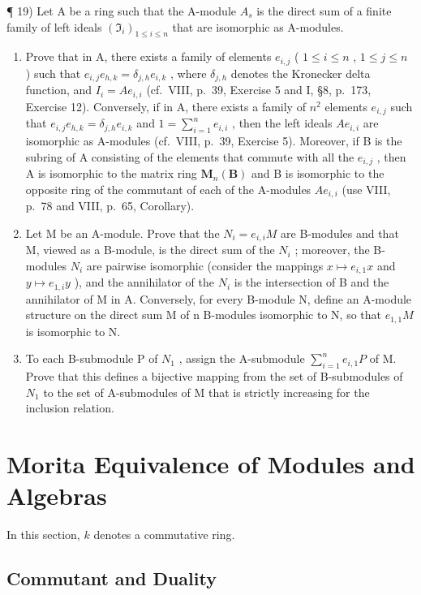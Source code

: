 ¶ 19) Let A be a ring such that the A-module \(A_{s}\) is the direct sum of a finite family of left ideals \((\mathfrak{I}_{i})_{1\leqslant i\leqslant n}\) that are isomorphic as A-modules.

\begin{enumerate}
\def\labelenumi{\alph{enumi})}
\item
  Prove that in A, there exists a family of elements \(e_{i,j}\) ( \(1 \leqslant i \leqslant n\) , \(1 \leqslant j \leqslant n\) ) such that \(e_{i,j}e_{h,k} = \delta_{j,h}e_{i,k}\) , where \(\delta_{j,h}\) denotes the Kronecker delta function, and \(I_i = Ae_{i,i}\) (cf.~VIII, p.~39, Exercise 5 and I, §8, p.~173, Exercise 12). Conversely, if in A, there exists a family of \(n^2\) elements \(e_{i,j}\) such that \(e_{i,j}e_{h,k} = \delta_{j,h}e_{i,k}\) and \(1 = \sum_{i=1}^{n} e_{i,i}\) , then the left ideals \(Ae_{i,i}\) are isomorphic as A-modules (cf.~VIII, p.~39, Exercise 5). Moreover, if B is the subring of A consisting of the elements that commute with all the \(e_{i,j}\) , then A is isomorphic to the matrix ring \(\mathbf{M}_n(\mathbf{B})\) and B is isomorphic to the opposite ring of the commutant of each of the A-modules \(Ae_{i,i}\) (use VIII, p.~78 and VIII, p.~65, Corollary).
\item
  Let M be an A-module. Prove that the \(N_{i} = e_{i,i}M\) are B-modules and that M, viewed as a B-module, is the direct sum of the \(N_{i}\) ; moreover, the B-modules \(N_{i}\) are pairwise isomorphic (consider the mappings \(x \mapsto e_{i,1}x\) and \(y \mapsto e_{1,i}y\) ), and the annihilator of the \(N_{i}\) is the intersection of B and the annihilator of M in A. Conversely, for every B-module N, define an A-module structure on the direct sum M of n B-modules isomorphic to N, so that \(e_{1,1}M\) is isomorphic to N.
\item
  To each B-submodule P of \(N_{1}\) , assign the A-submodule \(\sum_{i=1}^{n} e_{i,1}P\) of M. Prove that this defines a bijective mapping from the set of B-submodules of \(N_{1}\) to the set of A-submodules of M that is strictly increasing for the inclusion relation.
\end{enumerate}

\section{Morita Equivalence of Modules and Algebras}

In this section, \(k\) denotes a commutative ring.

\subsection{Commutant and Duality}

